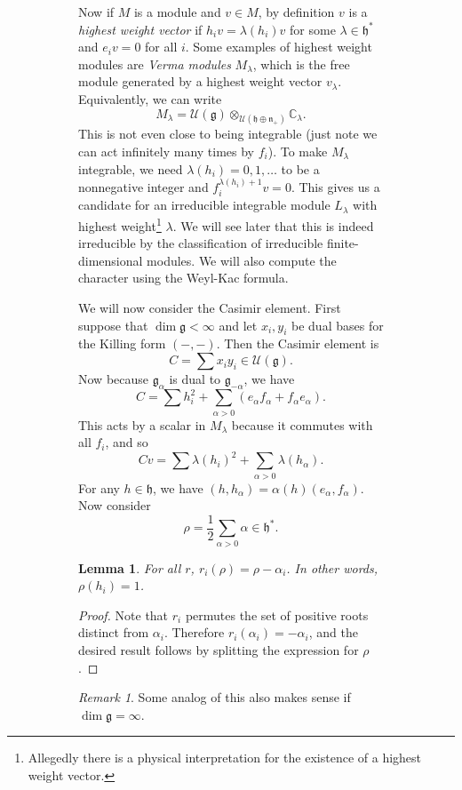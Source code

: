 \documentclass[leqno, openany]{memoir}
\newtheorem{lem}[thm]{Lemma}
\theoremstyle{definition}
\theoremstyle{remark}
\newtheorem{rmk}[thm]{Remark}
\theoremstyle{plain}
\theoremstyle{definition}
\theoremstyle{remark}
\newcommand{\C}{\mathbb{C}}
\newcommand{\mc}[1]{\mathcal{#1}}
\newcommand{\mf}[1]{\mathfrak{#1}}
\begin{document}
\begin{figure}[H]
\begin{figure}[H]
Now if $M$ is a module and $v \in M$, by definition $v$ is a \textit{highest
weight vector} if $h_i v = \lambda(h_i) v$ for some $\lambda \in \mf{h}^*$ and
$e_i v = 0$ for all $i$. Some examples of highest weight modules are
\textit{Verma modules} $M_{\lambda}$, which is the free module generated by a
highest weight vector $v_{\lambda}$. Equivalently, we can write \[ M_{\lambda}
= \mc{U}(\mf{g}) \otimes_{\mc{U}(\mf{h} \oplus \mf{n}_+)} \C_{\lambda}. \] This
is not even close to being integrable (just note we can act infinitely many
times by $f_i$). To make $M_{\lambda}$ integrable, we need $\lambda(h_i) =
0,1,\ldots$ to be a nonnegative integer and $f_i^{\lambda(h_i)+1} v = 0$. This
gives us a candidate for an irreducible integrable module $L_{\lambda}$ with
highest weight\footnote{Allegedly there is a physical interpretation for the
existence of a highest weight vector.} $\lambda$. We will see later that this
is indeed irreducible by the classification of irreducible finite-dimensional
modules. We will also compute the character using the Weyl-Kac formula.

We will now consider the Casimir element. First suppose that $\dim \mf{g} <
\infty$ and let $x_i, y_i$ be dual bases for the Killing form $(-,-)$. Then the
Casimir element is \[ C = \sum x_i y_i \in \mc{U}(\mf{g}). \] Now because
$\mf{g}_{\alpha}$ is dual to $\mf{g}_{-\alpha}$, we have \[ C = \sum h_i^2 +
    \sum_{\alpha > 0} (e_{\alpha} f_{\alpha} + f_{\alpha} e_{\alpha}). \] This
    acts by a scalar in $M_{\lambda}$ because it commutes with all $f_i$, and
    so \[ C v = \sum { \lambda(h_i) }^2 + \sum_{\alpha > 0}
    \lambda(h_{\alpha}). \] For any $h \in \mf{h}$, we have $(h, h_{\alpha}) =
    \alpha(h) (e_{\alpha}, f_{\alpha})$. Now consider \[ \rho = \frac{1}{2}
    \sum_{\alpha >0} \alpha \in \mf{h}^*. \]

\begin{lem} For all $r$, $r_i(\rho) = \rho - \alpha_i$. In other words,
$\rho(h_i) = 1$.  \end{lem}

\begin{proof} Note that $r_i$ permutes the set of positive roots distinct from
$\alpha_i$. Therefore $r_i(\alpha_i) = -\alpha_i$, and the desired result
follows by splitting the expression for $\rho$.  \end{proof}

\begin{rmk} Some analog of this also makes sense if $\dim \mf{g} = \infty$.
\end{rmk}


\end{figure}
\end{figure}
\end{document}
